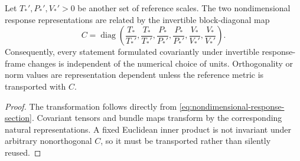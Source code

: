 \begin{proposition}
Let $T_*',P_*',V_*'>0$ be another set of reference scales.  The two nondimensional response representations are related by the invertible block-diagonal map
\[
C
=\operatorname{diag}
\left(
\frac{T_*}{T_*'},\frac{T_*}{T_*'},
\frac{P_*}{P_*'},\frac{P_*}{P_*'},
\frac{V_*}{V_*'},\frac{V_*}{V_*'}
\right).
\]
Consequently, every statement formulated covariantly under invertible response-frame changes is independent of the numerical choice of units.  Orthogonality or norm values are representation dependent unless the reference metric is transported with $C$.
\end{proposition}

\begin{proof}
The transformation follows directly from \eqref{eq:nondimensional-response-section}.  Covariant tensors and bundle maps transform by the corresponding natural representations.  A fixed Euclidean inner product is not invariant under arbitrary nonorthogonal $C$, so it must be transported rather than silently reused.
\end{proof}
